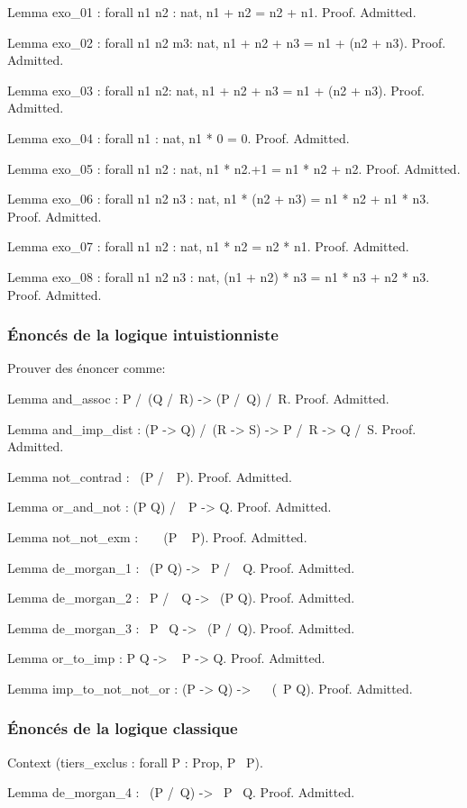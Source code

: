 \documentclass[a4paper,10pt]{article}
\begin{document}
\begin{coq}[]
Lemma exo_01 : forall n1 n2 : nat, n1 + n2 = n2 + n1.
Proof.
Admitted.

Lemma exo_02 : forall n1 n2 m3: nat, n1 + n2 + n3 = n1 + (n2 + n3).
Proof.
Admitted.

Lemma exo_03 : forall n1 n2: nat, n1 + n2 + n3 = n1 + (n2 + n3).
Proof.
Admitted.

Lemma exo_04 : forall n1 : nat, n1 * 0 = 0.
Proof.
Admitted.

Lemma exo_05 : forall n1 n2 : nat, n1 * n2.+1 = n1 * n2 + n2.
Proof.
Admitted.

Lemma exo_06 : forall n1 n2 n3 : nat, n1 * (n2 + n3) = n1 * n2 + n1 * n3.
Proof.
Admitted.

Lemma exo_07 : forall n1 n2 : nat, n1 * n2 = n2 * n1.
Proof.
Admitted.

Lemma exo_08 : forall n1 n2 n3 : nat, (n1 + n2) * n3 = n1 * n3 + n2 * n3.
Proof.
Admitted.
\end{coq}

\subsubsection{Énoncés de la logique intuistionniste}
\label{sec:orgac7b395}
Prouver des énoncer comme:

\begin{coq}[]
Lemma and_assoc : P /\ (Q /\ R) -> (P /\ Q) /\ R.
Proof.
Admitted.

Lemma and_imp_dist : (P -> Q) /\ (R -> S) -> P /\ R -> Q /\ S.
Proof.
Admitted.

Lemma not_contrad :  ~(P /\ ~P).
Proof.
Admitted.

Lemma or_and_not : (P \/ Q) /\ ~P -> Q.
Proof.
Admitted.

Lemma not_not_exm : ~ ~ (P \/ ~ P).
Proof.
Admitted.

Lemma de_morgan_1 : ~(P \/ Q) -> ~P /\ ~Q.
Proof.
Admitted.

Lemma de_morgan_2 : ~P /\ ~Q -> ~(P \/ Q).
Proof.
Admitted.

Lemma de_morgan_3 : ~P \/ ~Q -> ~(P /\ Q).
Proof.
Admitted.

Lemma or_to_imp : P \/ Q -> ~ P -> Q.
Proof.
Admitted.

Lemma imp_to_not_not_or : (P -> Q) -> ~ ~(~P \/ Q).
Proof.
Admitted.
\end{coq}

\subsubsection{Énoncés de la logique classique}
\label{sec:org78ee7af}
\begin{coq}[]
Context (tiers_exclus : forall P : Prop, P \/ ~P).

Lemma de_morgan_4 : ~(P /\ Q) -> ~P \/ ~Q.
Proof.
Admitted.
\end{coq}
\end{document}
